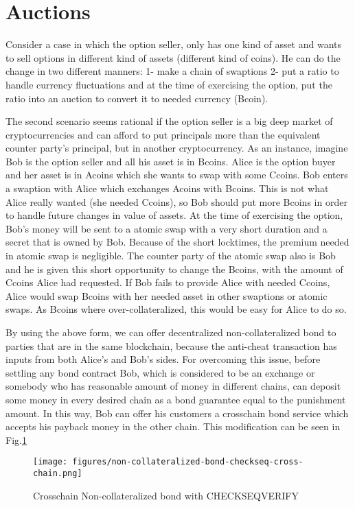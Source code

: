 
\section{Auctions}
\label{w-auctions}

    Consider a case in which the option seller, only has one kind of asset and wants to sell options in different kind of assets (different kind of coins). He can do the change in two different manners: 1- make a chain of swaptions 2- put a ratio to handle currency fluctuations and at the time of exercising the option, put the ratio into an auction to convert it to needed currency (Bcoin).

    The second scenario seems rational if the option seller is a big deep market of cryptocurrencies and can afford to put principals more than the equivalent counter party's principal, but in another cryptocurrency.
    As an instance, imagine Bob is the option seller and all his asset is in Bcoins. Alice is the option buyer and her asset is in Acoins which she wants to swap with some Ccoins. Bob enters a swaption with Alice which exchanges Acoins with Bcoins. This is not what Alice really wanted (she needed Ccoins), so Bob should put more Bcoins in order to handle future changes in value of assets. At the time of exercising the option, Bob's money will be sent to a atomic swap with a very short duration and a secret that is owned by Bob. Because of the short locktimes, the premium needed in atomic swap is negligible. The counter party of the atomic swap also is Bob and he is given this short opportunity to change the Bcoins, with the amount of Ccoins Alice had requested. If Bob fails to provide Alice with needed Ccoins, Alice would swap Bcoins with her needed asset in other swaptions or atomic swaps. As Bcoins where over-collateralized, this would be easy for Alice to do so.
    



By using the above form, we can offer decentralized non-collateralized bond to parties that are in the same blockchain, because the anti-cheat transaction has inputs from both Alice's and Bob's sides. For overcoming this issue, before settling any bond contract Bob, which is considered to be an exchange or somebody who has reasonable amount of money in different chains, can deposit some money in every desired chain as a bond guarantee equal to the punishment amount. In this way, Bob can offer his customers a crosschain bond service which accepts his payback money in the other chain. This modification can be seen in Fig.\ref{fig:cross-chain-non-collat-bond}


\begin{figure}
    \centering
    \texttt{[image: figures/non-collateralized-bond-checkseq-cross-chain.png]}
    \caption{Crosschain Non-collateralized bond with CHECKSEQVERIFY}
    \label{fig:cross-chain-non-collat-bond}
\end{figure}